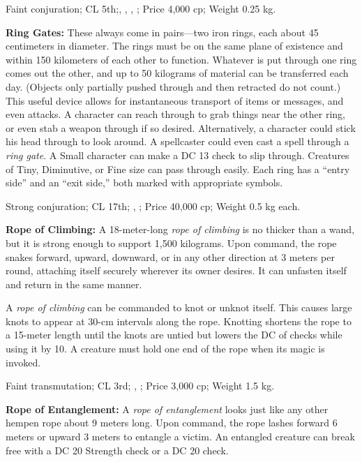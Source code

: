 Faint conjuration; CL 5th;, , , ; Price 4,000 cp; Weight 0.25 kg.



\textbf{Ring Gates:} These always come in pairs---two iron rings, each about 45 centimeters in diameter. The rings must be on the same plane of existence and within 150 kilometers of each other to function. Whatever is put through one ring comes out the other, and up to 50 kilograms of material can be transferred each day. (Objects only partially pushed through and then retracted do not count.) This useful device allows for instantaneous transport of items or messages, and even attacks. A character can reach through to grab things near the other ring, or even stab a weapon through if so desired. Alternatively, a character could stick his head through to look around. A spellcaster could even cast a spell through a \emph{ring gate}. A Small character can make a DC 13  check to slip through. Creatures of Tiny, Diminutive, or Fine size can pass through easily. Each ring has a ``entry side'' and an ``exit side,'' both marked with appropriate symbols.

Strong conjuration; CL 17th; , ; Price 40,000 cp; Weight 0.5 kg each.



\textbf{Rope of Climbing:} A 18-meter-long \emph{rope of climbing} is no thicker than a wand, but it is strong enough to support 1,500 kilograms. Upon command, the rope snakes forward, upward, downward, or in any other direction at 3 meters per round, attaching itself securely wherever its owner desires. It can unfasten itself and return in the same manner.

A \emph{rope of climbing} can be commanded to knot or unknot itself. This causes large knots to appear at 30-cm intervals along the rope. Knotting shortens the rope to a 15-meter length until the knots are untied but lowers the DC of  checks while using it by 10. A creature must hold one end of the rope when its magic is invoked.

Faint transmutation; CL 3rd; , ; Price 3,000 cp; Weight 1.5 kg.



\textbf{Rope of Entanglement:} A \emph{rope of entanglement} looks just like any other hempen rope about 9 meters long. Upon command, the rope lashes forward 6 meters or upward 3 meters to entangle a victim. An entangled creature can break free with a DC 20 Strength check or a DC 20  check.

